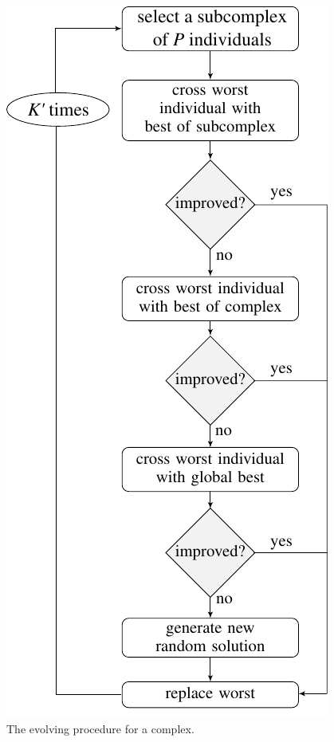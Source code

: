 \documentclass[conference, compsocconf]{IEEEtran}
\begin{document}
\begin{figure}
  \includegraphics{imgs/flow2}
  \caption{The evolving procedure for a complex.}
\end{figure}
\end{document}
